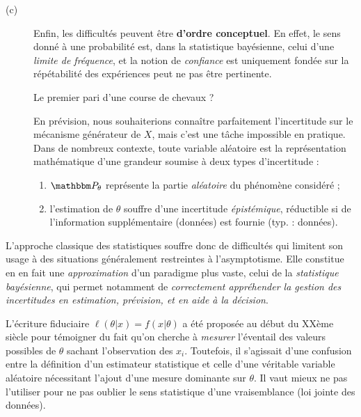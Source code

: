 \begin{description}
\begin{enumerate}
    \end{enumerate} 
    
\item[(c)] Enfin, les difficultés peuvent être {\bf d'ordre conceptuel}. En effet, le sens donné à une probabilité est, dans la statistique bayésienne, celui d'une \emph{limite de fréquence}, et la notion de \emph{confiance} est uniquement fondée sur la répétabilité des expériences peut ne pas \^etre pertinente. \\

\begin{exo} Le premier pari d'une course de chevaux ? \\
\end{exo}

En prévision, nous souhaiterions connaître parfaitement l'incertitude sur le mécanisme générateur de $X$, mais c'est une t\^ache impossible en pratique. Dans de nombreux contexte, toute variable aléatoire est la représentation mathématique d'une grandeur soumise à deux types d'incertitude :
\begin{enumerate}
    \item $\Pp_{\theta}$ représente la partie \emph{aléatoire} du phénomène considéré ; 
    \item l'estimation de $\theta$ souffre d'une incertitude \emph{épistémique}, réductible si de l'information supplémentaire (données) est fournie (typ. : données). \\
\end{enumerate}

\end{description}


L'approche classique des statistiques souffre donc de difficultés qui limitent son usage à des situations généralement restreintes à l'asymptotisme. Elle constitue en en fait une \emph{approximation} d'un paradigme plus vaste, celui de la \emph{statistique bayésienne}, qui permet notamment de \emph{correctement appréhender la gestion des incertitudes en estimation, prévision, et en aide à la décision}. \\


\begin{remark}
L'écriture fiduciaire $\ell(\theta|x)=f(x|\theta)$ a été proposée au début du XXème siècle pour témoigner du fait qu'on cherche à \emph{mesurer} l'éventail des valeurs possibles de $\theta$ sachant l'observation des $x_i$. Toutefois, il s'agissait d'une confusion entre la définition d'un estimateur statistique et celle d'une véritable variable aléatoire nécessitant l'ajout d'une mesure dominante sur $\theta$. Il vaut mieux ne pas l'utiliser pour ne pas oublier le sens statistique d'une vraisemblance (loi jointe des données). 
\end{remark}





